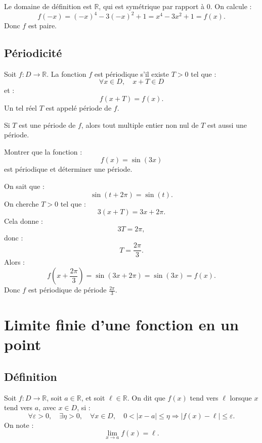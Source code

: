 \documentclass[11pt,a4paper]{article}
\newcommand{\R}{\mathbb R}
\newcommand{\implique}{\Longrightarrow}
\begin{document}
\begin{correctionbox}
Le domaine de définition est \(\R\), qui est symétrique par rapport à \(0\).  
On calcule :
\[
f(-x)=(-x)^4-3(-x)^2+1=x^4-3x^2+1=f(x).
\]
Donc \(f\) est paire.
\end{correctionbox}

\subsection{Périodicité}

\begin{definitionbox}
Soit \(f:D\to\R\).  
La fonction \(f\) est périodique s'il existe \(T>0\) tel que :
\[
\forall x\in D,\quad x+T\in D
\]
et :
\[
f(x+T)=f(x).
\]
Un tel réel \(T\) est appelé période de \(f\).
\end{definitionbox}

\begin{retenirbox}
Si \(T\) est une période de \(f\), alors tout multiple entier non nul de \(T\) est aussi une période.
\end{retenirbox}

\begin{exercicebox}[Périodicité]
Montrer que la fonction :
\[
f(x)=\sin(3x)
\]
est périodique et déterminer une période.
\end{exercicebox}

\begin{correctionbox}
On sait que :
\[
\sin(t+2\pi)=\sin(t).
\]
On cherche \(T>0\) tel que :
\[
3(x+T)=3x+2\pi.
\]
Cela donne :
\[
3T=2\pi,
\]
donc :
\[
T=\frac{2\pi}{3}.
\]
Alors :
\[
f\left(x+\frac{2\pi}{3}\right)
=
\sin\left(3x+2\pi\right)
=
\sin(3x)
=
f(x).
\]
Donc \(f\) est périodique de période \(\frac{2\pi}{3}\).
\end{correctionbox}

\section{Limite finie d'une fonction en un point}

\subsection{Définition}

\begin{definitionbox}
Soit \(f:D\to\R\), soit \(a\in\R\), et soit \(\ell\in\R\).  
On dit que \(f(x)\) tend vers \(\ell\) lorsque \(x\) tend vers \(a\), avec \(x\in D\), si :
\[
\forall \varepsilon>0,\quad \exists \eta>0,\quad \forall x\in D,\quad
0<|x-a|\leq \eta \implique |f(x)-\ell|\leq\varepsilon.
\]
On note :
\[
\lim_{x\to a}f(x)=\ell.
\]
\end{definitionbox}
\end{document}

